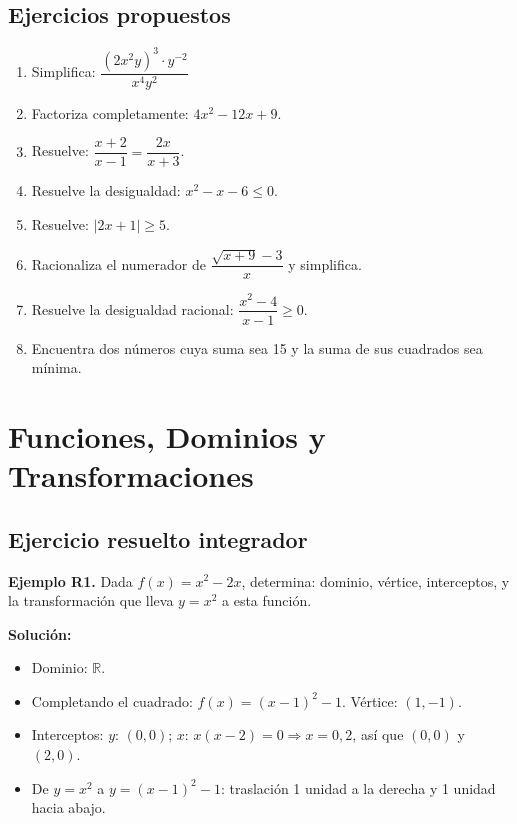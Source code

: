 \documentclass[12pt, a4paper]{article}
\begin{document}
\subsection{Ejercicios propuestos}

\begin{enumerate}[leftmargin=*]
  \item \facil{} Simplifica: $\dfrac{(2x^2y)^3 \cdot y^{-2}}{x^{4} y^{2}}$

  \item \facil{} Factoriza completamente: $4x^2 - 12x + 9$.

  \item \facil{} Resuelve: $\dfrac{x + 2}{x - 1} = \dfrac{2x}{x + 3}$.

  \item \medio{} Resuelve la desigualdad: $x^2 - x - 6 \leq 0$.

  \item \medio{} Resuelve: $|2x + 1| \geq 5$.

  \item \dificil{} Racionaliza el numerador de $\dfrac{\sqrt{x + 9} - 3}{x}$ y simplifica.

  \item \dificil{} Resuelve la desigualdad racional: $\dfrac{x^2 - 4}{x - 1} \geq 0$.

  \item \dificil{} Encuentra dos números cuya suma sea 15 y la suma de sus cuadrados sea mínima.
\end{enumerate}

\vspace{4pt}

\section{Funciones, Dominios y Transformaciones}

\subsection{Ejercicio resuelto integrador}

\textbf{Ejemplo R1.} Dada $f(x) = x^2 - 2x$, determina: dominio, vértice, interceptos, y la transformación que lleva $y = x^2$ a esta función.

\begin{cuadrosolucion}
  \textbf{Solución:}
  \begin{itemize}
    \item Dominio: $\mathbb{R}$.
    \item Completando el cuadrado: $f(x) = (x - 1)^2 - 1$. Vértice: $(1, -1)$.
    \item Interceptos: $y$: $(0, 0)$; $x$: $x(x - 2) = 0 \Rightarrow x = 0, 2$, así que $(0, 0)$ y $(2, 0)$.
    \item De $y = x^2$ a $y = (x - 1)^2 - 1$: traslación 1 unidad a la derecha y 1 unidad hacia abajo.
  \end{itemize}
\end{cuadrosolucion}
\end{document}
